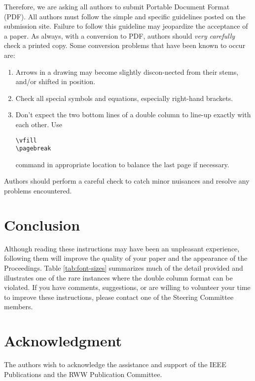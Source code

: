 \documentclass[10pt,conference,letterpaper]{RWWTemplate}
\begin{document}
Therefore, we are asking all authors to submit Portable Document Format (PDF). All authors must follow the simple and specific guidelines posted on the submission site. Failure to follow this guideline may jeopardize the acceptance of a paper. As always, with a conversion to PDF, authors should {\it very carefully} check a printed copy. Some conversion problems that have been known to occur are:
\begin{enumerate}
\item Arrows in a drawing may become slightly discon-nected from their
  stems, and/or shifted in position.

\item Check all special symbols and equations, especially right-hand
  brackets.

\item Don't expect the two bottom lines of a double column to line-up
  exactly with each other. Use 
\begin{verbatim}
\vfill
\pagebreak
\end{verbatim} command in appropriate
  location to balance the last page if necessary.
\end{enumerate}
Authors should perform a careful check to catch minor nuisances and
resolve any problems encountered.

\section{Conclusion}
Although reading these instructions may have been an unpleasant
experience, following them will improve the quality of your paper and
the appearance of the Proceedings. Table \ref{tab:font-sizes}
summarizes much of the detail
provided and illustrates one of the rare instances where
the double column format can be violated. If you have comments,
suggestions, or are willing to volunteer your time to improve these
instructions, please contact one of the Steering Committee members.


\section*{Acknowledgment}
The authors wish to acknowledge the assistance and support of the IEEE Publications and the RWW Publication Committee. 



\end{document}
